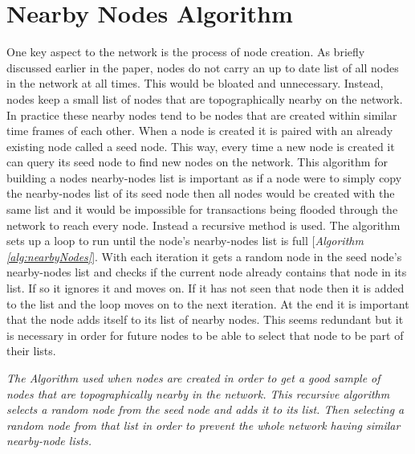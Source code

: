 \documentclass{l4proj}
\begin{document}
\section{Nearby Nodes Algorithm}
One key aspect to the network is the process of node creation. As briefly discussed earlier in the paper, nodes
do not carry an up to date list of all nodes in the network at all times. This would be bloated and unnecessary.
Instead, nodes keep a small list of nodes that are topographically nearby on the network. In practice these nearby
nodes tend to be nodes that are created within similar time frames of each other. When a node is created it is
paired with an already existing node called a seed node. This way, every time a new node is created it can query
its seed node to find new nodes on the network. This algorithm for building a nodes nearby-nodes list is important
as if a node were to simply copy the nearby-nodes list of its seed node then all nodes would be created with the
same list and it would be impossible for transactions being flooded through the network to reach every node. Instead
a recursive method is used. The algorithm sets up a loop to run until the node's nearby-nodes list is full
[\textit{Algorithm \ref{alg:nearbyNodes}}]. With each iteration it gets a random node in the seed node's nearby-nodes list and checks if 
the current node already contains that node in its list. If so it ignores it and moves on. If it has not seen 
that node then it is added to the list and the loop moves on to the next iteration. At the end it is important 
that the node adds itself to its list of nearby nodes. This seems redundant but it is necessary in order for 
future nodes to be able to select that node to be part of their lists.

\begin{algorithm}
    \DontPrintSemicolon
    \vspace{1cm}
    
\caption{
    \textit{The Algorithm used when nodes are created in order to get a good sample of nodes that are topographically nearby
    in the network. This recursive algorithm selects a random node from the seed node and adds it to its list. Then
    selecting a random node from that list in order to prevent the whole network having similar nearby-node lists.}
}
\label{alg:nearbyNodes}
\end{algorithm}
\end{document}
